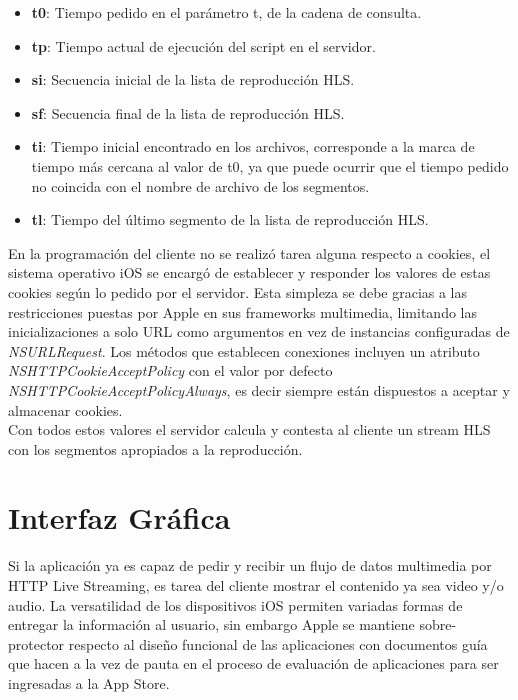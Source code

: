 \begin{itemize}
\item \textbf{t0}: Tiempo pedido en el parámetro t, de la cadena de consulta.
\item \textbf{tp}: Tiempo actual de ejecución del script en el servidor.
\item \textbf{si}: Secuencia inicial de la lista de reproducción HLS.
\item \textbf{sf}: Secuencia final de la lista de reproducción HLS.
\item \textbf{ti}: Tiempo inicial encontrado en los archivos, corresponde a la marca de tiempo más cercana al valor de t0, ya que puede ocurrir que el tiempo pedido no coincida con el nombre de archivo de los segmentos.
\item \textbf{tl}: Tiempo del último segmento de la lista de reproducción HLS.

\end{itemize}
 
En la programación del cliente no se realizó tarea alguna respecto a cookies, el sistema operativo iOS se encargó de establecer y responder los valores de estas cookies según lo pedido por el servidor. Esta simpleza se debe gracias a las restricciones puestas por Apple en sus frameworks multimedia, limitando las inicializaciones a solo URL como argumentos en vez de instancias configuradas de \textit{NSURLRequest}. 
Los métodos que establecen conexiones incluyen un atributo \textit{NSHTTPCookieAcceptPolicy} con el valor por defecto \textit{NSHTTPCookieAcceptPolicyAlways}, es decir siempre están dispuestos a aceptar y almacenar cookies. \\

Con todos estos valores el servidor calcula y contesta al cliente un stream HLS con los segmentos apropiados a la reproducción.
	
	
\clearpage
\section{Interfaz Gráfica}

Si la aplicación ya es capaz de pedir y recibir un flujo de datos multimedia por HTTP Live Streaming, es tarea del cliente mostrar el contenido ya sea video y/o audio. La versatilidad de los dispositivos iOS permiten variadas formas de entregar la información al usuario, sin embargo Apple se mantiene sobre-protector respecto al diseño funcional de las aplicaciones con documentos guía que hacen a la vez de pauta en el proceso de evaluación de aplicaciones para ser ingresadas a la App Store.

